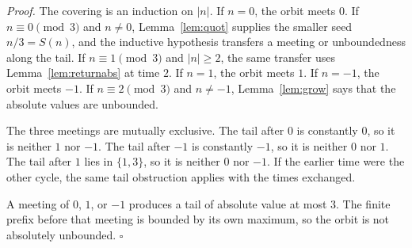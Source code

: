 \documentclass[11pt,letterpaper]{article}
\newenvironment{proof}{\noindent\textit{Proof.}}{\hfill\(\square\)}
\begin{document}
\begin{proof}
The covering is an induction on \(\lvert n\rvert\). If \(n=0\), the orbit meets \(0\). If \(n\equiv 0\pmod{3}\) and \(n\neq 0\), Lemma~\ref{lem:quot} supplies the smaller seed \(n/3=S(n)\), and the inductive hypothesis transfers a meeting or unboundedness along the tail. If \(n\equiv 1\pmod{3}\) and \(\lvert n\rvert\ge 2\), the same transfer uses Lemma~\ref{lem:returnabs} at time \(2\). If \(n=1\), the orbit meets \(1\). If \(n=-1\), the orbit meets \(-1\). If \(n\equiv 2\pmod{3}\) and \(n\neq -1\), Lemma~\ref{lem:grow} says that the absolute values are unbounded.

The three meetings are mutually exclusive. The tail after \(0\) is constantly \(0\), so it is neither \(1\) nor \(-1\). The tail after \(-1\) is constantly \(-1\), so it is neither \(0\) nor \(1\). The tail after \(1\) lies in \(\{1,3\}\), so it is neither \(0\) nor \(-1\). If the earlier time were the other cycle, the same tail obstruction applies with the times exchanged.

A meeting of \(0\), \(1\), or \(-1\) produces a tail of absolute value at most \(3\). The finite prefix before that meeting is bounded by its own maximum, so the orbit is not absolutely unbounded.
\end{proof}
\end{document}

